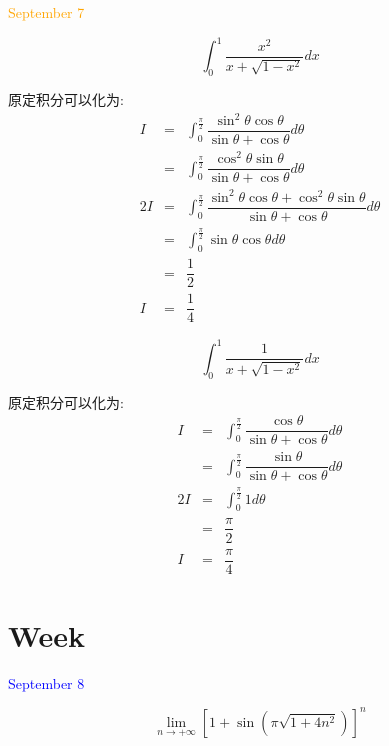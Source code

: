 \textcolor{orange}{September 7}

\begin{example}[][Exam: 35.1.13]
	$$\int_{0}^{1}\dfrac{x^2}{x+\sqrt{1-x^2}}dx$$
\end{example}

\begin{solution}

	原定积分可以化为:  
	\begin{eqnarray*}
		I&=&\int_{0}^{\frac{\pi}{2}}\dfrac{\sin^2\theta\cos\theta}{\sin\theta+\cos\theta}d\theta\\
		&=&\int_{0}^{\frac{\pi}{2}}\dfrac{\cos^2\theta\sin\theta}{\sin\theta+\cos\theta}d\theta\\
		2I&=&\int_{0}^{\frac{\pi}{2}}\dfrac{\sin^2\theta\cos\theta+\cos^2\theta\sin\theta}{\sin\theta+\cos\theta}d\theta\\
		&=&\int_{0}^{\frac{\pi}{2}}\sin\theta\cos\theta d\theta\\
		&=&\dfrac{1}{2}\\
		I&=&\dfrac{1}{4}
	\end{eqnarray*}
\end{solution}

\begin{example}[][Exam: 35.1.14]
	$$\int_{0}^{1}\dfrac{1}{x+\sqrt{1-x^2}}dx$$
\end{example}

\begin{solution}

	原定积分可以化为:  
	\begin{eqnarray*}
		I&=&\int_{0}^{\frac{\pi}{2}}\dfrac{\cos\theta}{\sin\theta+\cos\theta}d\theta\\
		&=&\int_{0}^{\frac{\pi}{2}}\dfrac{\sin\theta}{\sin\theta+\cos\theta}d\theta\\
		2I&=&\int_{0}^{\frac{\pi}{2}}1d\theta\\
		&=&\dfrac{\pi}{2}\\
		I&=&\dfrac{\pi}{4}
	\end{eqnarray*}
\end{solution}


\section{Week }
\textcolor{blue}{September 8}

\begin{example}[][Exam: 35.2.1]
	$$\lim\limits_{n\to+\infty}\left[1+\sin\left(\pi\sqrt{1+4n^2} \right) \right]^n$$
\end{example}

